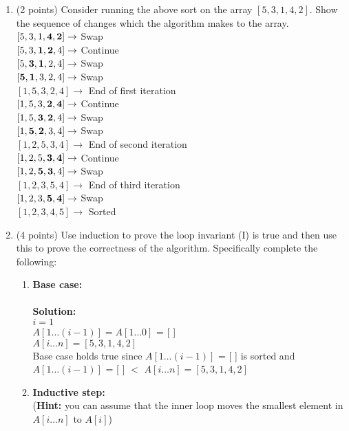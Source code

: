 \documentclass[12pt]{elsart}
\begin{document}
\begin{enumerate}
   \item (2 points) Consider running the above sort on the array $[5,3,1,4,2]$.  Show the sequence of changes which the algorithm makes to the array.\\ 
$[5,3,1,{\bf 4,2}]\rightarrow$ Swap\\
$[5,3,{\bf 1,2},4]\rightarrow$ Continue\\
$[5,{\bf 3,1},2,4]\rightarrow$ Swap\\
$[{\bf 5,1},3,2,4]\rightarrow$ Swap\\
$[1,5,3,2,4]         \rightarrow$ End of first iteration\\
$[1,5,3,{\bf 2,4}]\rightarrow$ Continue\\
$[1,5,{\bf 3,2},4]\rightarrow$ Swap\\
$[1,{\bf 5,2},3,4]\rightarrow$ Swap\\
$[1,2,5,3,4]         \rightarrow$ End of second iteration\\
$[1,2,5,{\bf 3,4}]\rightarrow$ Continue\\
$[1,2,{\bf 5,3},4]\rightarrow$ Swap\\
$[1,2,3,5,4]         \rightarrow$ End of third iteration\\
$[1,2,3,{\bf 5,4}]\rightarrow$ Swap\\
$[1,2,3,4,5]         \rightarrow$ Sorted\\
  \item (4 points) Use induction to prove the loop invariant (I) is true and then use this to prove the correctness of the algorithm.  Specifically complete the following:
\begin{enumerate}
   \item {\bf Base case:}\\\\
	{\bf Solution:}\\
	$i = 1$\\ 
	$A[1\ldots (i-1)] = A[1\ldots 0]$ = [  ]\\ 
	$A[i \ldots n] = [5,3,1,4,2]$\\ 
	Base case holds true since $A[1\ldots (i-1)]$ = [  ] is sorted and\\
	$A[1\ldots (i-1)]$ = [  ] $<$ $A[i \ldots n] = [5,3,1,4,2]$\\
  \item {\bf Inductive step:}\\ 
	({\bf Hint:} you can assume that the inner loop moves the smallest element in $A[i \ldots n]$ to $A[i]$)\\\\

\end{enumerate}
\end{enumerate}
\end{document}

